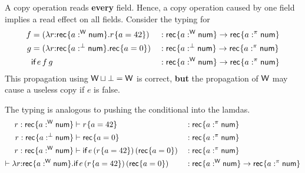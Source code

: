 \documentclass{llncs}
\begin{document}
A copy operation reads \textbf{every} field. Hence, a copy operation
caused by one field implies a read effect on all fields.
\clearpage{}
Consider the typing for 
\begin{align*}
  f
  &=(\lambda r{:}\textsf{rec}^{{}}\{ a:^\textsf{W} \textsf{num}\}. r^{{}}\{a=42\})
  &&: \textsf{rec}^{{}}\{ a:^\textsf{W} \textsf{num}\} \to \textsf{rec}^{{}}\{ a:^\pi \textsf{num}\}
  \\
  g
  &=(\lambda r{:}\textsf{rec}^{{}}\{a :^\bot \textsf{num}\}. \textsf{rec}^{{}}\{a = 0\})
  &&: \textsf{rec}^{{}}\{a :^\bot \textsf{num}\} \to \textsf{rec}^{{}}\{ a:^\pi \textsf{num}\}
  \\
  &\textsf{if}\,e\,f\,{g}
  &&: \textsf{rec}^{{}}\{ a:^\textsf{W} \textsf{num}\} \to \textsf{rec}^{{}}\{ a:^\pi \textsf{num}\}
\end{align*}
This propagation using $\textsf{W}\sqcup\bot = \textsf{W}$ is correct,
\textbf{but} the propagation of $\textsf{W}$  may cause a useless copy if $e$ is false.

The typing is analogous to pushing the conditional into the lamdas.
\begin{align*}
  r : \textsf{rec}^{{}}\{ a:^\textsf{W} \textsf{num}\} & \vdash r^{{}}\{a=42\} &&: \textsf{rec}^{{}}\{ a:^\pi \textsf{num}\}
  \\
  r : \textsf{rec}^{{}}\{ a:^\bot \textsf{num}\} & \vdash \textsf{rec}^{{}}\{a = 0\} &&: \textsf{rec}^{{}}\{ a:^\pi \textsf{num}\}
  \\
  r : \textsf{rec}^{{}}\{ a:^\textsf{W} \textsf{num}\}& \vdash \textsf{if}\,e\,( r^{{}}\{a=42\})\,{(\textsf{rec}^{{}}\{a = 0\})} &&: \textsf{rec}^{{}}\{ a:^\pi \textsf{num}\}
  \\
  \vdash \lambda r{:}\textsf{rec}^{{}}\{ a:^\textsf{W} \textsf{num}\}. & \textsf{if}\,e\,( r^{{}}\{a=42\})\,{(\textsf{rec}^{{}}\{a = 0\})}
                                                  &&: {\textsf{rec}^{{}}\{ a:^\textsf{W} \textsf{num}\}} \to \textsf{rec}^{{}}\{ a:^\pi \textsf{num}\}
\end{align*}
\end{document}
